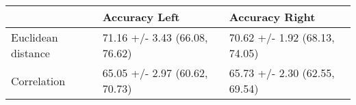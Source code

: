 \begin{tabular}{lll}
\toprule
{} &                  Accuracy Left &                 Accuracy Right \\
\midrule
Euclidean distance &  71.16 +/- 3.43 (66.08, 76.62) &  70.62 +/- 1.92 (68.13, 74.05) \\
Correlation        &  65.05 +/- 2.97 (60.62, 70.73) &  65.73 +/- 2.30 (62.55, 69.54) \\
\bottomrule
\end{tabular}
